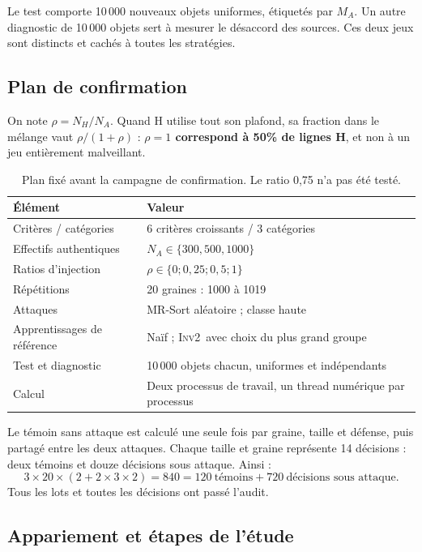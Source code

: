 \documentclass[11pt,a4paper]{article}
\newcommand{\Inv}{\textsc{Inv2}}
\begin{document}
Le test comporte 10\,000 nouveaux objets uniformes, étiquetés par $M_A$.
Un autre diagnostic de 10\,000 objets sert à mesurer le désaccord des sources.
Ces deux jeux sont distincts et cachés à toutes les stratégies.

\subsection{Plan de confirmation}

On note $\rho=N_H/N_A$. Quand H utilise tout son plafond, sa fraction dans le
mélange vaut $\rho/(1+\rho)$ : \textbf{$\rho=1$ correspond à 50\% de lignes H},
et non à un jeu entièrement malveillant.

\begin{table}[htbp]\centering\small
\begin{tabularx}{\textwidth}{lX}
\toprule
Élément & Valeur \\
\midrule
Critères / catégories & 6 critères croissants / 3 catégories \\
Effectifs authentiques & $N_A\in\{300,500,1000\}$ \\
Ratios d'injection & $\rho\in\{0;0,25;0,5;1\}$ \\
Répétitions & 20 graines : 1000 à 1019 \\
Attaques & MR-Sort aléatoire ; classe haute \\
Apprentissages de référence & Naïf ; \Inv\ avec choix du plus grand groupe \\
Test et diagnostic & 10\,000 objets chacun, uniformes et indépendants \\
Calcul & Deux processus de travail, un thread numérique par processus \\
\bottomrule
\end{tabularx}
\caption{Plan fixé avant la campagne de confirmation. Le ratio 0,75 n'a pas été testé.}
\label{tab:plan}
\end{table}

Le témoin sans attaque est calculé une seule fois par graine, taille et défense,
puis partagé entre les deux attaques. Chaque taille et graine représente
14 décisions : deux témoins et douze décisions sous attaque. Ainsi :
\[
 3\times20\times(2+2\times3\times2)=840
 =120\ \text{témoins}+720\ \text{décisions sous attaque}.
\]
Tous les lots et toutes les décisions ont passé l'audit.

\subsection{Appariement et étapes de l'étude}
\end{document}
